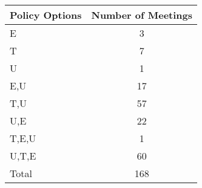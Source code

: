 \begin{tabular}{lc}
\hline\hline 
\addlinespace 
Policy Options & Number of Meetings \\ 
\hline 
E & 3 \\
T & 7 \\
U & 1 \\
E,U & 17 \\
T,U & 57 \\
U,E & 22 \\
T,E,U & 1 \\
U,T,E & 60 \\
\addlinespace 
Total & 168 \\
\hline 
\end{tabular}